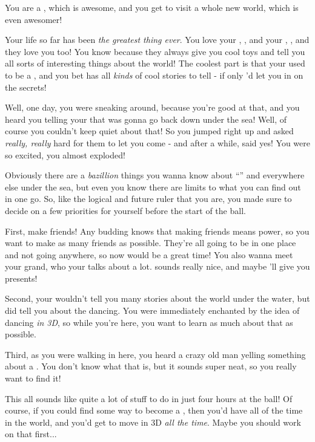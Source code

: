 \documentclass[char]{NeptuneBall}
\begin{document}
\name{\cWillow{}}

You are a \cWillow{\prince}, which is awesome, and you get to visit a whole new world, which is even awesomer!

Your life so far has been \emph{the greatest thing ever}. You love your \cAriel{\pa}, \cAriel{}, and your \cEric{\pa}, \cEric{}, and they love you too! You know because they always give you cool toys and tell you all sorts of interesting things about the world! The coolest part is that your \cAriel{\pa} used to be a \emph{\cAriel{\mer}}, and you bet \cAriel{\they} has all \emph{kinds} of cool stories to tell - if only \cAriel{\they}'d let you in on the secrets!

Well, one day, you were sneaking around, because you're good at that, and you heard you \cAriel{\pa} telling your \cEric{\pa} that \cAriel{\they} was gonna go back down under the sea! Well, of course you couldn't keep quiet about that! So you jumped right up and asked \emph{really, really} hard for them to let you come - and after a while, \cEric{\pa} said yes! You were so excited, you almost exploded!

Obviously there are a \emph{bazillion} things you wanna know about "`\pAtlantis{}"' and everywhere else under the sea, but even you know there are limits to what you can find out in one go. So, like the logical \cWillow{\prince} and future ruler that you are, you made sure to decide on a few priorities for yourself before the start of the ball.

First, make friends! Any budding \cWillow{\prince} knows that making friends means power, so you want to make as many friends as possible. They're all going to be in one place and not going anywhere, so now would be a great time! You also wanna meet your grand\cKing{\pa}, who your \cAriel{\pa} talks about a lot. \cKing{\They} sounds really nice, and maybe \cKing{\they}'ll give you presents!

Second, your \cAriel{\pa} wouldn't tell you many stories about the world under the water, but \cAriel{\they} did tell you about the dancing. You were immediately enchanted by the idea of dancing \emph{in 3D}, so while you're here, you want to learn as much about that as possible.

Third, as you were walking in here, you heard a crazy old man yelling something about a \iWishingStone{\MYname}. You don't know what that is, but it sounds super neat, so you really want to find it!

This all sounds like quite a lot of stuff to do in just four hours at the ball! Of course, if you could find some way to become a \cWillow{\mer}, then you'd have all of the time in the world, and you'd get to move in 3D \emph{all the time}. Maybe you should work on that first...
\end{document}
